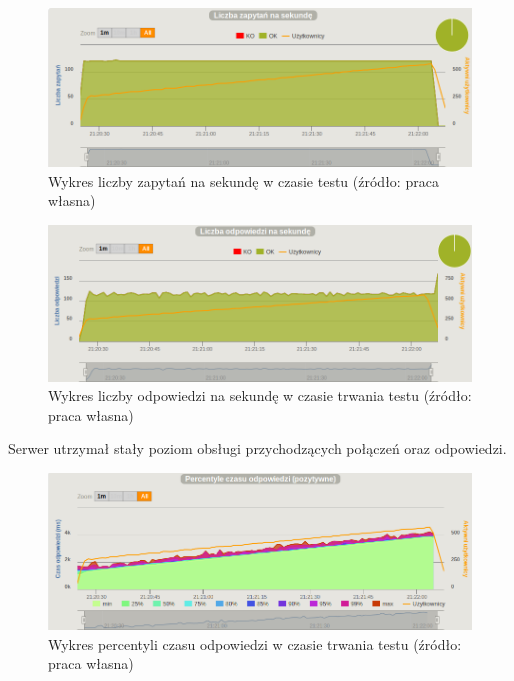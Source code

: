 \documentclass[12pt,twoside]{article}
\begin{document}
\begin{figure}[htbp]
\centering
\includegraphics[resolution=150]{test_results/java/file/screenshots/requests.png}
\caption{Wykres liczby zapytań na sekundę w czasie testu (źródło: praca własna)}
\end{figure}

\begin{figure}[htbp]
\centering
\includegraphics[resolution=150]{test_results/java/file/screenshots/responses.png}
\caption{Wykres liczby odpowiedzi na sekundę w czasie trwania testu (źródło: praca własna)}
\end{figure}

Serwer utrzymał stały poziom obsługi przychodzących połączeń oraz
odpowiedzi.

\begin{figure}[htbp]
\centering
\includegraphics[resolution=150]{test_results/java/file/screenshots/response_percentile.png}
\caption{Wykres percentyli czasu odpowiedzi w czasie trwania testu (źródło: praca własna)}
\end{figure}
\end{document}
